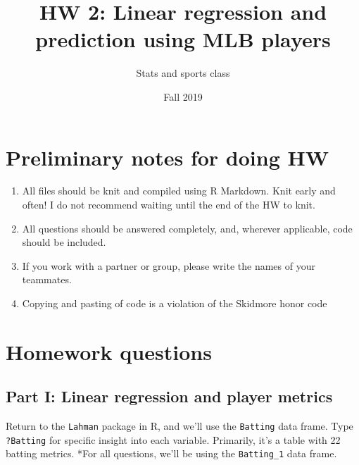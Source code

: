 \documentclass[]{article}
\title{HW 2: Linear regression and prediction using MLB players}
\author{Stats and sports class}
\date{Fall 2019}
\newenvironment{Shaded}{\begin{snugshade}}{\end{snugshade}}
\newcommand{\DecValTok}[1]{\textcolor[rgb]{0.00,0.00,0.81}{#1}}
\newcommand{\KeywordTok}[1]{\textcolor[rgb]{0.13,0.29,0.53}{\textbf{#1}}}
\newcommand{\NormalTok}[1]{#1}
\newcommand{\OperatorTok}[1]{\textcolor[rgb]{0.81,0.36,0.00}{\textbf{#1}}}
\newcommand{\StringTok}[1]{\textcolor[rgb]{0.31,0.60,0.02}{#1}}
\begin{document}
\maketitle

\hypertarget{preliminary-notes-for-doing-hw}{%
\section{Preliminary notes for doing
HW}\label{preliminary-notes-for-doing-hw}}

\begin{enumerate}
\def\labelenumi{\arabic{enumi}.}
\item
  All files should be knit and compiled using R Markdown. Knit early and
  often! I do not recommend waiting until the end of the HW to knit.
\item
  All questions should be answered completely, and, wherever applicable,
  code should be included.
\item
  If you work with a partner or group, please write the names of your
  teammates.
\item
  Copying and pasting of code is a violation of the Skidmore honor code
\end{enumerate}

\hypertarget{homework-questions}{%
\section{Homework questions}\label{homework-questions}}

\hypertarget{part-i-linear-regression-and-player-metrics}{%
\subsection{Part I: Linear regression and player
metrics}\label{part-i-linear-regression-and-player-metrics}}

Return to the \texttt{Lahman} package in R, and we'll use the
\texttt{Batting} data frame. Type \texttt{?Batting} for specific insight
into each variable. Primarily, it's a table with 22 batting metrics.
*For all questions, we'll be using the \texttt{Batting\_1} data frame.

\begin{Shaded}
\end{Shaded}
\end{document}
